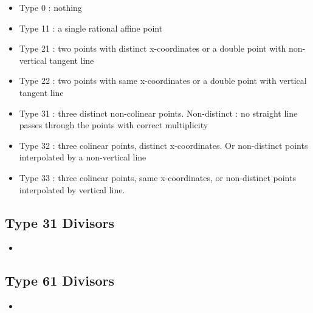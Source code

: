 \begin{itemize}
  \item Type 0 : nothing 
  \item Type 11 : a single rational affine point
  \item Type 21 : two points with distinct x-coordinates or a double point with non-vertical tangent line
  \item Type 22 : two points with same x-coordinates or a double point with vertical tangent line
  \item Type 31 : three distinct non-colinear points. Non-distinct : no straight line passes through the points with correct multiplicity
  \item Type 32 : three colinear points, distinct x-coordinates. Or non-distinct points interpolated by a non-vertical line
  \item Type 33 : three colinear points, same x-coordinates, or non-distinct points interpolated by vertical line.
\end{itemize}



\subsection{Type 31 Divisors}

\begin{itemize}
  \item
\end{itemize}



\subsection{Type 61 Divisors}

\begin{itemize}
  \item
\end{itemize}

